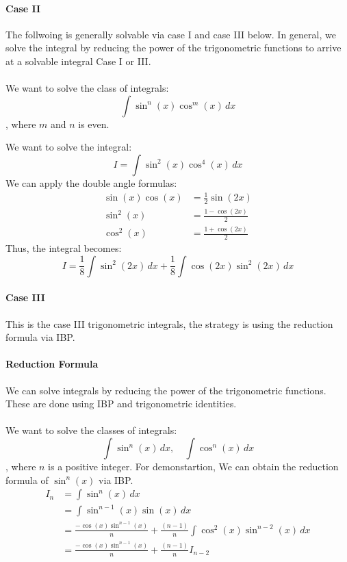 \documentclass[11pt]{article}
\begin{document}
\paragraph{Case II} The follwoing is generally solvable via case I and case III below. In general, we solve the integral by reducing the power of the trigonometric functions to arrive at a solvable integral Case I or III.
\paragraph{} We want to solve the class of integrals:
\begin{equation} \int \sin^n(x) \cos^m(x) \, dx \end{equation}
, where $m$ and $n$ is even.
\begin{example}
We want to solve the integral:
$$ I = \int \sin^2(x) \cos^4(x) \, dx $$
We can apply the double angle formulas:
\begin{align}
    \sin(x)\cos(x) &= \frac{1}{2} \sin(2x) \\
    \sin^2(x) &= \frac{1 - \cos(2x)}{2} \\
    \cos^2(x) &= \frac{1 + \cos(2x)}{2}
\end{align}
Thus, the integral becomes:
$$ I = \frac{1}{8} \int \sin^2(2x) \, dx + \frac{1}{8} \int \cos(2x)\sin^2(2x) \, dx $$
\end{example}
\paragraph{Case III} This is the case III trigonometric integrals, the strategy is using the reduction formula via IBP.
\paragraph{Reduction Formula} We can solve integrals by reducing the power of the trigonometric functions. These are done using IBP and trigonometric identities.
\paragraph{} We want to solve the classes of integrals:
\begin{equation} 
    \int \sin^n(x) \, dx, \quad \int \cos^n(x) \, dx 
\end{equation}
, where $n$ is a positive integer. For demonstartion, We can obtain the reduction formula of $\sin^n(x)$ via IBP.
\begin{align}
    I_n &= \int \sin^n(x) \, dx \nonumber \\
    &= \int \sin^{n-1}(x) \sin(x) \, dx \nonumber \\
    &= \frac{-\cos(x) \sin^{n-1}(x)}{n} + \frac{(n-1)}{n} \int \cos^2(x) \sin^{n-2}(x) \, dx \nonumber \\
    &= \frac{-\cos(x) \sin^{n-1}(x)}{n} + \frac{(n-1)}{n} I_{n-2}
\end{align}
\end{document}
